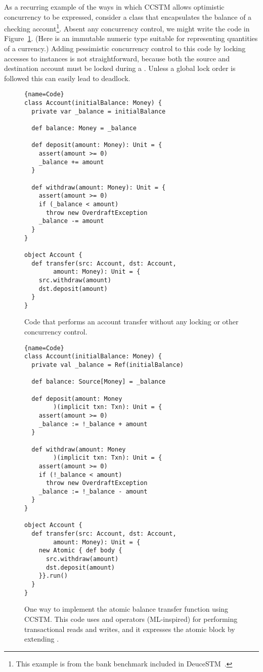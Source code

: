 As a recurring example of the ways in which CCSTM allows optimistic concurrency
to be expressed, consider a class that encapsulates the balance of a
checking account\footnote{This example is from the bank benchmark included
in DeuceSTM~\cite{deucestm}.}.  Absent any concurrency control, we might
write the code in Figure~\ref{fig:example:nosync}.  (Here 
is an immutable numeric type suitable for representing quantities of
a currency.)  Adding pessimistic concurrency control to this code by
locking accesses to  instances is not straightforward,
because both the source and destination account must be locked during
a .  Unless a global lock order is followed this can
easily lead to deadlock.

\begin{figure}
\begin{lstlisting}{name=Code}
class Account(initialBalance: Money) {
  private var _balance = initialBalance

  def balance: Money = _balance

  def deposit(amount: Money): Unit = {
    assert(amount >= 0)
    _balance += amount
  }

  def withdraw(amount: Money): Unit = {
    assert(amount >= 0)
    if (_balance < amount)
      throw new OverdraftException
    _balance -= amount
  }
}

object Account {
  def transfer(src: Account, dst: Account,
        amount: Money): Unit = {
    src.withdraw(amount)
    dst.deposit(amount)
  }
}
\end{lstlisting}

\caption{Code that performs an account transfer without
any locking or other concurrency control.}

\label{fig:example:nosync}
\end{figure}

\begin{figure}
\begin{lstlisting}{name=Code}
class Account(initialBalance: Money) {
  private val _balance = Ref(initialBalance)

  def balance: Source[Money] = _balance

  def deposit(amount: Money
        )(implicit txn: Txn): Unit = {
    assert(amount >= 0)
    _balance := !_balance + amount
  }

  def withdraw(amount: Money
        )(implicit txn: Txn): Unit = {
    assert(amount >= 0)
    if (!_balance < amount)
      throw new OverdraftException
    _balance := !_balance - amount
  }
}

object Account {
  def transfer(src: Account, dst: Account,
        amount: Money): Unit = {
    new Atomic { def body {
      src.withdraw(amount)
      dst.deposit(amount)
    }}.run()
  }
}
\end{lstlisting}

\caption{One way to implement the atomic balance transfer function
using CCSTM.  This code uses  and \code{:=} operators
(ML-inspired) for performing transactional reads and writes, and it
expresses the atomic block by extending .}

\label{fig:example:ccstm}
\end{figure}

